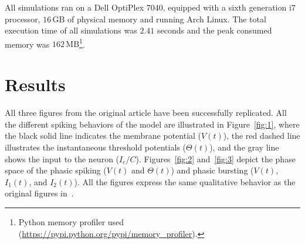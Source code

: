 \documentclass[10pt,a4paper,onecolumn]{article}
\newcommand{\Rm}[1]{\mathrm{#1}}
\begin{document}
All simulations ran on a Dell OptiPlex $7040$, equipped with a sixth
generation i$7$ processor, $16\, \Rm{GB}$ of physical memory and running Arch
Linux. The total execution time of all simulations was $2.41$ seconds and the
peak consumed memory was $162\, \Rm{MB}$\footnote{Python memory profiler used
    (\url{https://pypi.python.org/pypi/memory_profiler}).}\@. 

\clearpage

\section{Results}\label{results}

All three figures from the original article have been successfully replicated.
All the different spiking behaviors of the model are illustrated in 
Figure~\ref{fig:1}, where the black solid line indicates the membrane potential
($V(t)$), the red dashed line illustrates the instantaneous threshold potentials
($\Theta(t)$), and the gray line shows the input to the neuron ($I_e/C$).
Figures~\ref{fig:2} and~\ref{fig:3} depict the phase space of the phasic
spiking ($V(t)$ and $\Theta(t)$) and phasic bursting ($V(t)$,
$I_1(t)$, and $I_2(t)$). All the figures express the same qualitative
behavior as the original figures in~\cite{mihalas:2009}.
\end{document}
